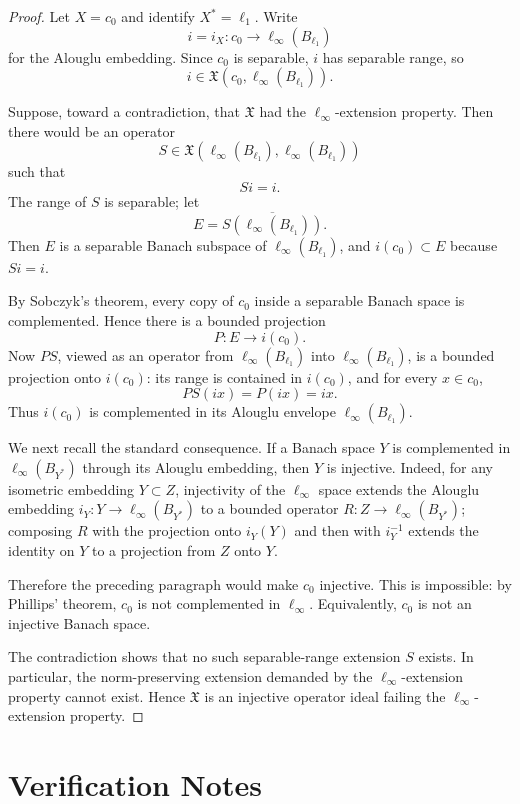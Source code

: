 \documentclass[11pt]{article}
\newcommand{\cX}{\mathfrak X}
\newcommand{\linf}{\ell_\infty}
\newcommand{\ellone}{\ell_1}
\newcommand{\czero}{c_0}
\newcommand{\Ball}{B}
\begin{document}
\begin{proof}
Let $X=\czero$ and identify $X^*=\ellone$. Write
\[
i=i_X:\czero\longrightarrow \linf(\Ball_{\ellone})
\]
for the Alouglu embedding. Since $\czero$ is separable, $i$ has separable range, so
\[
i\in \cX(\czero,\linf(\Ball_{\ellone})).
\]

Suppose, toward a contradiction, that $\cX$ had the $\ell_\infty$-extension property. Then there would be an operator
\[
S\in \cX(\linf(\Ball_{\ellone}),\linf(\Ball_{\ellone}))
\]
such that
\[
S i = i.
\]
The range of $S$ is separable; let
\[
E=\overline{S(\linf(\Ball_{\ellone}))}.
\]
Then $E$ is a separable Banach subspace of $\linf(\Ball_{\ellone})$, and $i(\czero)\subset E$ because $S i=i$.

By Sobczyk's theorem, every copy of $\czero$ inside a separable Banach space is complemented. Hence there is a bounded projection
\[
P:E\to i(\czero).
\]
Now $PS$, viewed as an operator from $\linf(\Ball_{\ellone})$ into $\linf(\Ball_{\ellone})$, is a bounded projection onto $i(\czero)$: its range is contained in $i(\czero)$, and for every $x\in\czero$,
\[
PS(i x)=P(i x)=i x.
\]
Thus $i(\czero)$ is complemented in its Alouglu envelope $\linf(\Ball_{\ellone})$.

We next recall the standard consequence. If a Banach space $Y$ is complemented in $\linf(\Ball_{Y^*})$ through its Alouglu embedding, then $Y$ is injective. Indeed, for any isometric embedding $Y\subset Z$, injectivity of the $\linf$ space extends the Alouglu embedding $i_Y:Y\to \linf(\Ball_{Y^*})$ to a bounded operator $R:Z\to \linf(\Ball_{Y^*})$; composing $R$ with the projection onto $i_Y(Y)$ and then with $i_Y^{-1}$ extends the identity on $Y$ to a projection from $Z$ onto $Y$.

Therefore the preceding paragraph would make $\czero$ injective. This is impossible: by Phillips' theorem, $\czero$ is not complemented in $\linf$. Equivalently, $\czero$ is not an injective Banach space.

The contradiction shows that no such separable-range extension $S$ exists. In particular, the norm-preserving extension demanded by the $\ell_\infty$-extension property cannot exist. Hence $\cX$ is an injective operator ideal failing the $\ell_\infty$-extension property.
\end{proof}

\section*{Verification Notes}
\end{document}
